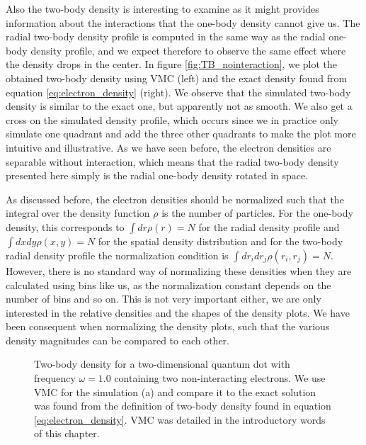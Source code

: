Also the two-body density is interesting to examine as it might provides information about the interactions that the one-body density cannot give us. The radial two-body density profile is computed in the same way as the radial one-body density profile, and we expect therefore to observe the same effect where the density drops in the center. In figure \eqref{fig:TB_nointeraction}, we plot the obtained two-body density using VMC (left) and the exact density found from equation \eqref{eq:electron_density} (right). We observe that the simulated two-body density is similar to the exact one, but apparently not as smooth. We also get a cross on the simulated density profile, which occurs since we in practice only simulate one quadrant and add the three other quadrants to make the plot more intuitive and illustrative. As we have seen before, the electron densities are separable without interaction, which means that the radial two-body density presented here simply is the radial one-body density rotated in space. 

As discussed before, the electron densities should be normalized such that the integral over the density function $\rho$ is the number of particles. For the one-body density, this corresponds to $\int dr\rho(r)=N$ for the radial density profile and $\int dxdy\rho(x,y)=N$ for the spatial density distribution and for the two-body radial density profile the normalization condition is $\int dr_idr_j\rho(r_i,r_j)=N$. However, there is no standard way of normalizing these densities when they are calculated using bins like us, as the normalization constant depends on the number of bins and so on. This is not very important either, we are only interested in the relative densities and the shapes of the density plots. We have been consequent when normalizing the density plots, such that the various density magnitudes can be compared to each other.

\begin{figure}
	\centering
	\captionsetup[subfigure]{labelformat=empty}
	\caption{Two-body density for a two-dimensional quantum dot with frequency $\omega=1.0$ containing two non-interacting electrons. We use VMC for the simulation (a) and compare it to the exact solution was found from the definition of two-body density found in equation \eqref{eq:electron_density}. VMC was detailed in the introductory words of this chapter.}%
	\label{fig:TB_nointeraction}
\end{figure}

